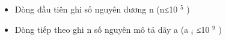 \begin{itemize}
	\item     Dòng đầu tiên ghi số nguyên dương n (n≤10    $^     5    $    )   
	\item     Dòng  tiếp theo ghi n số nguyên mô tả dãy a (a    $_     i    $    ≤10    $^     9    $    )   
\end{itemize}

\